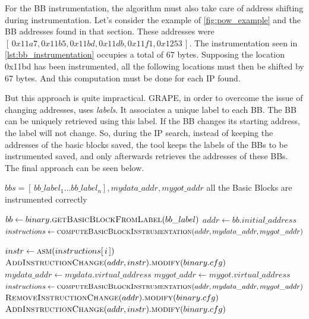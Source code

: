 For the \gls{BB} instrumentation, the algorithm must also take care of address shifting during instrumentation.
Let's consider the example of \cref{fig:pow_example} and the \gls{BB} addresses found in that section.
These addresses were $[\, 0x11a7 , 0x11b5, 0x11bd , 0x11db , 0x11f1 , 0x1253 \,]$.
The instrumentation seen in \cref{lst:bb_instrumentation} occupies a total of 67 bytes.
Supposing the location 0x11bd has been instrumented, all the following locations must then be shifted by 67 bytes.
And this computation must be done for each \gls{IP} found.

But this approach is quite impractical.
GRAPE, in order to overcome the issue of changing addresses, uses \textit{labels}.
It associates a unique label to each \gls{BB}. The \gls{BB} can be uniquely retrieved using this label.
If the \gls{BB} changes its starting address, the label will not change.
So, during the \gls{IP} search, instead of keeping the addresses of the basic blocks saved, the tool keeps the labels
of the \gls{BB}s to be instrumented saved, and only afterwards retrieves the addresses of these \gls{BB}s.
The final approach can be seen below.

\begin{algorithm}[ht]
    \caption{Instrument Basic Block algorithm}
    \label{alg:bb_instr}
    \begin{algorithmic}[1]
        \REQUIRE $bbs=[\, bb\_label_1 \dots bb\_label_n] , mydata\_addr , mygot\_addr$ 
        \ENSURE all the Basic Blocks are instrumented correctly

            \STATE $bb \gets binary.\textsc{getBasicBlockFromLabel}(bb\_label)$ \COMMENT{\small \textcolor{green!60!black}{``binary'' is the main object used by GRAPE and is a virtual representation of the ELF it is rewriting}}
            \STATE $addr \gets bb.initial\_address$
            \STATE $instructions \gets \textsc{computeBasicBlockInstrumentation}(addr,mydata\_addr,mygot\_addr)$ 

                    \STATE $instr \gets \textsc{asm}(instructions[\,i\,])$ 
                    \STATE $\textsc{AddInstructionChange}(addr,instr).\textsc{modify}(binary.cfg)$
                        \STATE $mydata\_addr \gets mydata.virtual\_address$
                        \STATE $mygot\_addr \gets mygot.virtual\_address$
                        \STATE $instructions \gets \textsc{computeBasicBlockInstrumentation}(addr,mydata\_addr,mygot\_addr)$ 
                        \STATE $\textsc{RemoveInstructionChange}(addr).\textsc{modify}(binary.cfg)$ 
                        \STATE $\textsc{AddInstructionChange}(addr,instr).\textsc{modify}(binary.cfg)$
                    \ENDIF
            \ENDFOR
        \ENDFOR
    \end{algorithmic}
\end{algorithm}

